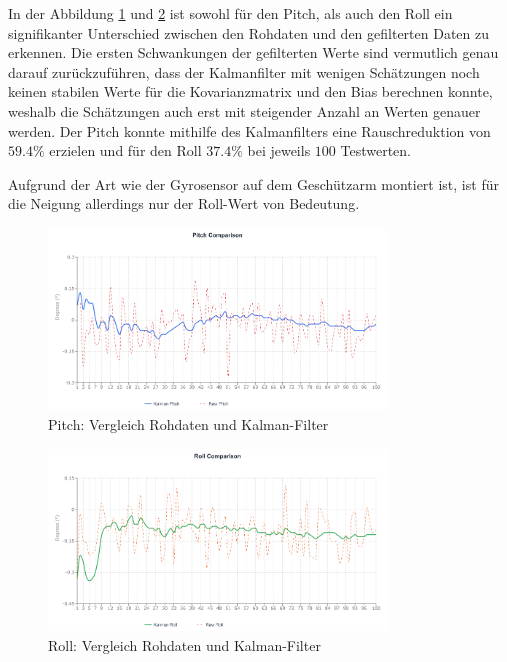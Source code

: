 \begin{samepage}
    In der Abbildung \ref{fig:pitch_pitch} und \ref{fig:roll_roll} ist sowohl für den Pitch, als auch den Roll ein signifikanter Unterschied zwischen den Rohdaten und den gefilterten Daten zu erkennen. Die ersten Schwankungen der gefilterten Werte sind vermutlich genau darauf zurückzuführen, dass der Kalmanfilter mit wenigen Schätzungen noch keinen stabilen Werte für die Kovarianzmatrix und den Bias berechnen konnte, weshalb die Schätzungen auch erst mit steigender Anzahl an Werten genauer werden.
    Der Pitch konnte mithilfe des Kalmanfilters eine Rauschreduktion von $59.4\%$ erzielen und für den Roll $37.4\%$ bei jeweils $100$ Testwerten.

    Aufgrund der Art wie der Gyrosensor auf dem Geschützarm montiert ist, ist für die Neigung allerdings nur der Roll-Wert von Bedeutung.

   \begin{figure}[H]
    \centering
    \includegraphics[width=0.8\textwidth]{images/kalman_comparison_pitch_2025-06-23.png}
    \caption{Pitch: Vergleich Rohdaten und Kalman-Filter}
    \label{fig:pitch_pitch}
    \end{figure}

    \begin{figure}[H]
        \centering
        \includegraphics[width=0.8\textwidth]{images/kalman_comparison_roll_2025-06-23.png}
        \caption{Roll: Vergleich Rohdaten und Kalman-Filter}
        \label{fig:roll_roll}
    \end{figure}
\end{samepage}



